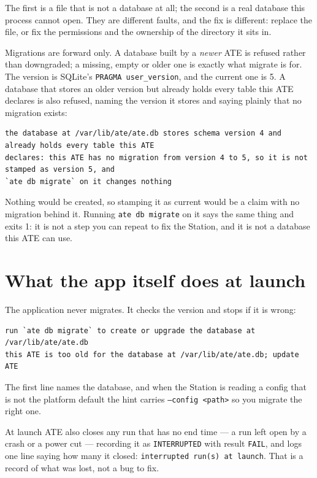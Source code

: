 The first is a file that is not a database at all; the second is a real database this process cannot
open. They are different faults, and the fix is different: replace the file, or fix the permissions
and the ownership of the directory it sits in.

Migrations are forward only. A database built by a \emph{newer} ATE is refused rather than
downgraded; a missing, empty or older one is exactly what migrate is for. The version is SQLite's
\texttt{PRAGMA user\_version}, and the current one is 5. A database that stores an older version but
already holds every table this ATE declares is also refused, naming the version it stores and saying
plainly that no migration exists:

\begin{lstlisting}[language=ATEShell]
the database at /var/lib/ate/ate.db stores schema version 4 and already holds every table this ATE
declares: this ATE has no migration from version 4 to 5, so it is not stamped as version 5, and
`ate db migrate` on it changes nothing
\end{lstlisting}

Nothing would be created, so stamping it as current would be a claim with no migration behind it.
Running \texttt{ate db migrate} on it says the same thing and exits 1: it is not a step you can
repeat to fix the Station, and it is not a database this ATE can use.

\section{What the app itself does at launch}

The application never migrates. It checks the version and stops if it is wrong:

\begin{lstlisting}[language=ATEShell]
run `ate db migrate` to create or upgrade the database at /var/lib/ate/ate.db
this ATE is too old for the database at /var/lib/ate/ate.db; update ATE
\end{lstlisting}

The first line names the database, and when the Station is reading a config that is not the
platform default the hint carries \texttt{--config <path>} so you migrate the right one.

At launch ATE also closes any run that has no end time --- a run left open by a crash or a power
cut --- recording it as \texttt{INTERRUPTED} with result \texttt{FAIL}, and logs one line saying
how many it closed: \texttt{interrupted run(s) at launch}. That is a record of what was lost, not a
bug to fix.

